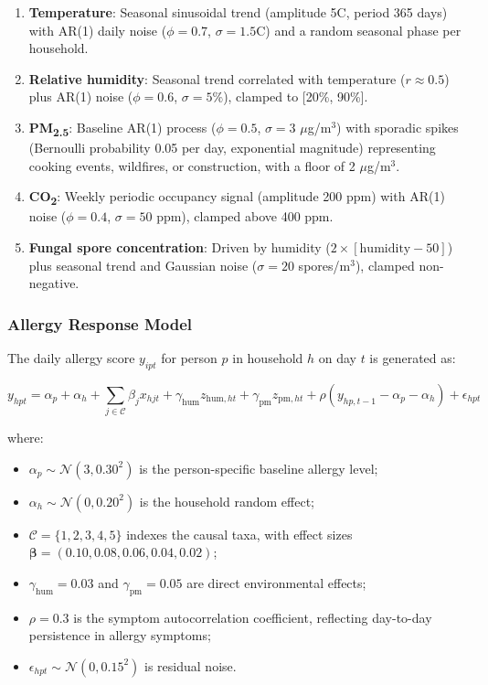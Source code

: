 \documentclass[11pt,letterpaper]{article}
\begin{document}
\begin{enumerate}
    \item \textbf{Temperature}: Seasonal sinusoidal trend (amplitude 5\textdegree C, period 365 days) with AR(1) daily noise ($\phi = 0.7$, $\sigma = 1.5$\textdegree C) and a random seasonal phase per household.

    \item \textbf{Relative humidity}: Seasonal trend correlated with temperature ($r \approx 0.5$) plus AR(1) noise ($\phi = 0.6$, $\sigma = 5\%$), clamped to [20\%, 90\%].

    \item \textbf{PM\textsubscript{2.5}}: Baseline AR(1) process ($\phi = 0.5$, $\sigma = 3$ $\mu$g/m$^3$) with sporadic spikes (Bernoulli probability 0.05 per day, exponential magnitude) representing cooking events, wildfires, or construction, with a floor of 2 $\mu$g/m$^3$.

    \item \textbf{CO\textsubscript{2}}: Weekly periodic occupancy signal (amplitude 200 ppm) with AR(1) noise ($\phi = 0.4$, $\sigma = 50$ ppm), clamped above 400 ppm.

    \item \textbf{Fungal spore concentration}: Driven by humidity ($2 \times [\text{humidity} - 50]$) plus seasonal trend and Gaussian noise ($\sigma = 20$ spores/m$^3$), clamped non-negative.
\end{enumerate}

\subsubsection{Allergy Response Model}

The daily allergy score $y_{ipt}$ for person $p$ in household $h$ on day $t$ is generated as:

\begin{equation}
    y_{hpt} = \alpha_p + \alpha_h + \sum_{j \in \mathcal{C}} \beta_j x_{hjt} + \gamma_{\text{hum}} z_{\text{hum},ht} + \gamma_{\text{pm}} z_{\text{pm},ht} + \rho \left( y_{hp,t-1} - \alpha_p - \alpha_h \right) + \epsilon_{hpt}
    \label{eq:allergy}
\end{equation}

\noindent where:
\begin{itemize}
    \item $\alpha_p \sim \mathcal{N}(3, 0.30^2)$ is the person-specific baseline allergy level;
    \item $\alpha_h \sim \mathcal{N}(0, 0.20^2)$ is the household random effect;
    \item $\mathcal{C} = \{1, 2, 3, 4, 5\}$ indexes the causal taxa, with effect sizes $\boldsymbol{\beta} = (0.10, 0.08, 0.06, 0.04, 0.02)$;
    \item $\gamma_{\text{hum}} = 0.03$ and $\gamma_{\text{pm}} = 0.05$ are direct environmental effects;
    \item $\rho = 0.3$ is the symptom autocorrelation coefficient, reflecting day-to-day persistence in allergy symptoms;
    \item $\epsilon_{hpt} \sim \mathcal{N}(0, 0.15^2)$ is residual noise.
\end{itemize}
\end{document}

